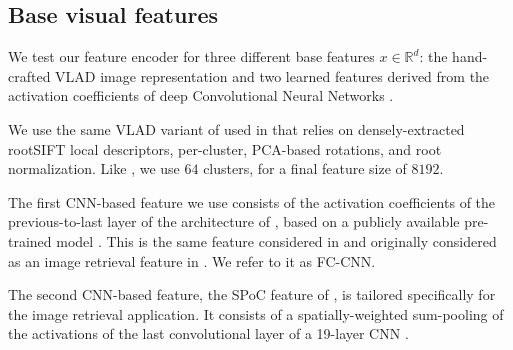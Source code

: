 \subsection{Base visual features}
We test our feature encoder for three different base features $x\in\mathbb{R}^d$: the hand-crafted VLAD image representation \cite{Delhumeau2013} and two learned features derived from the activation coefficients of deep Convolutional Neural Networks \cite{Krizhevsky2012,babenko15}.

We use the same VLAD variant of \cite{Delhumeau2013} used in \cite{ZePe15} that relies on densely-extracted rootSIFT \cite{3things} local descriptors, per-cluster, PCA-based rotations, and root normalization. Like \cite{ZePe15}, we use $64$ clusters, for a final feature size of $8192$.

The first CNN-based feature we use consists of the activation coefficients of the previous-to-last layer of the architecture of \cite{Krizhevsky2012}, based on a publicly available pre-trained model \cite{jia2014caffe}. This is the same feature considered in \cite{ZePe15} and originally considered as an image retrieval feature in \cite{Sharif}. We refer to it as FC-CNN. 

The second CNN-based feature, the SPoC feature of \cite{babenko15}, is tailored specifically for the image retrieval application. It consists of a spatially-weighted sum-pooling of the activations of the last convolutional layer of a 19-layer CNN \cite{Simonyan2014}.



